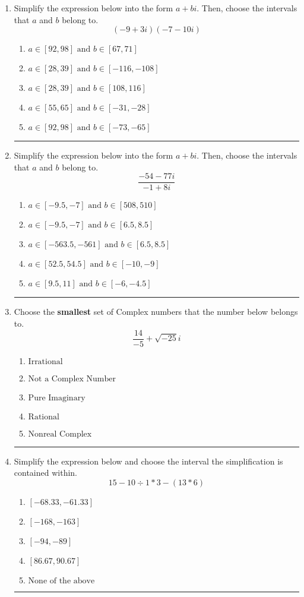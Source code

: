 \documentclass[14pt]{extbook}
\newcommand{\litem}[1]{\item#1\hspace*{-1cm}\rule{\textwidth}{0.4pt}}
\begin{document}
\begin{enumerate}
{\begin{enumerate}[label=\Alph*.]
\end{enumerate} }
\litem{
Simplify the expression below into the form $a+bi$. Then, choose the intervals that $a$ and $b$ belong to.\[ (-9 + 3 i)(-7 - 10 i) \]\begin{enumerate}[label=\Alph*.]
\item \( a \in [92, 98] \text{ and } b \in [67, 71] \)
\item \( a \in [28, 39] \text{ and } b \in [-116, -108] \)
\item \( a \in [28, 39] \text{ and } b \in [108, 116] \)
\item \( a \in [55, 65] \text{ and } b \in [-31, -28] \)
\item \( a \in [92, 98] \text{ and } b \in [-73, -65] \)

\end{enumerate} }
\litem{
Simplify the expression below into the form $a+bi$. Then, choose the intervals that $a$ and $b$ belong to.\[ \frac{-54 - 77 i}{-1 + 8 i} \]\begin{enumerate}[label=\Alph*.]
\item \( a \in [-9.5, -7] \text{ and } b \in [508, 510] \)
\item \( a \in [-9.5, -7] \text{ and } b \in [6.5, 8.5] \)
\item \( a \in [-563.5, -561] \text{ and } b \in [6.5, 8.5] \)
\item \( a \in [52.5, 54.5] \text{ and } b \in [-10, -9] \)
\item \( a \in [9.5, 11] \text{ and } b \in [-6, -4.5] \)

\end{enumerate} }
\litem{
Choose the \textbf{smallest} set of Complex numbers that the number below belongs to.\[ \frac{14}{-5}+\sqrt{-25}i \]\begin{enumerate}[label=\Alph*.]
\item \( \text{Irrational} \)
\item \( \text{Not a Complex Number} \)
\item \( \text{Pure Imaginary} \)
\item \( \text{Rational} \)
\item \( \text{Nonreal Complex} \)

\end{enumerate} }
\litem{
Simplify the expression below and choose the interval the simplification is contained within.\[ 15 - 10 \div 1 * 3 - (13 * 6) \]\begin{enumerate}[label=\Alph*.]
\item \( [-68.33, -61.33] \)
\item \( [-168, -163] \)
\item \( [-94, -89] \)
\item \( [86.67, 90.67] \)
\item \( \text{None of the above} \)


\end{enumerate}}
\end{enumerate}
\end{document}
